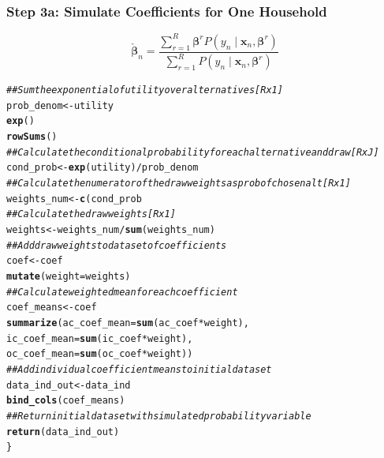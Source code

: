 \documentclass{beamer}\usepackage[]{graphicx}\usepackage[]{xcolor}
\makeatletter
\newcommand{\hlcom}[1]{\textcolor[rgb]{0.678,0.584,0.686}{\textit{#1}}}%
\newcommand{\hlopt}[1]{\textcolor[rgb]{0,0,0}{#1}}%
\newcommand{\hlstd}[1]{\textcolor[rgb]{0.345,0.345,0.345}{#1}}%
\newcommand{\hlkwb}[1]{\textcolor[rgb]{0.69,0.353,0.396}{#1}}%
\newcommand{\hlkwc}[1]{\textcolor[rgb]{0.333,0.667,0.333}{#1}}%
\newcommand{\hlkwd}[1]{\textcolor[rgb]{0.737,0.353,0.396}{\textbf{#1}}}%
\newenvironment{kframe}{%
 \def\at@end@of@kframe{}%
 \ifinner\ifhmode%
  \def\at@end@of@kframe{\end{minipage}}%
  \begin{minipage}{\columnwidth}%
 \fi\fi%
 \def\FrameCommand##1{\hskip\@totalleftmargin \hskip-\fboxsep
 \colorbox{shadecolor}{##1}\hskip-\fboxsep
     \hskip-\linewidth \hskip-\@totalleftmargin \hskip\columnwidth}%
 \MakeFramed {\advance\hsize-\width
   \@totalleftmargin\z@ \linewidth\hsize
   \@setminipage}}%
 {\par\unskip\endMakeFramed%
 \at@end@of@kframe}
\newenvironment{knitrout}{}{} %
\makeatother
\begin{document}

\begin{frame}[fragile]\frametitle{Step 3a: Simulate Coefficients for One Household}
    $$\check{\bm{\beta}}_n = \frac{\sum_{r = 1}^R \bm{\beta}^r P(y_n \mid \bm{x}_n, \bm{\beta}^r)}{\sum_{r = 1}^R P(y_n \mid \bm{x}_n, \bm{\beta}^r)}$$
\begin{knitrout}\tiny
{}\color{fgcolor}\begin{kframe}
\begin{alltt}
\hlcom{  ## Sum the exponential of utility over alternatives [R x 1]}
  prob_denom <- utility %
    \hlkwd{exp}() %
    \hlkwd{rowSums}()
\hlcom{  ## Calculate the conditional probability for each alternative and draw [R x J]}
  cond_prob <- \hlkwd{exp}(utility) / prob_denom
\hlcom{  ## Calculate the numerator of the draw weights as prob of chosen alt [R x 1]}
  weights_num <- \hlkwd{c}(cond_prob %
\hlcom{  ## Calculate the draw weights [R x 1]}
  weights <- weights_num / \hlkwd{sum}(weights_num)
\hlcom{  ## Add draw weights to dataset of coefficients}
  coef <- coef %
    \hlkwd{mutate}(weight = weights)
\hlcom{  ## Calculate weighted mean for each coefficient}
  coef_means <- coef %
    \hlkwd{summarize}(ac_coef_mean = \hlkwd{sum}(ac_coef * weight),
              ic_coef_mean = \hlkwd{sum}(ic_coef * weight),
              oc_coef_mean = \hlkwd{sum}(oc_coef * weight))
\hlcom{  ## Add individual coefficient means to initial dataset}
  data_ind_out <- data_ind %
    \hlkwd{bind_cols}(coef_means)
\hlcom{  ## Return initial dataset with simulated probability variable}
  \hlkwd{return}(data_ind_out)
\}
\end{alltt}
\end{kframe}
\end{knitrout}
\end{frame}
\end{document}
